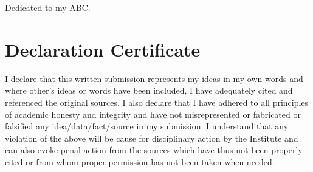 \begin{dedication}
Dedicated to my ABC.
\end{dedication}



\chapter*{Declaration Certificate}

\noindent I declare that this written submission represents my ideas in my own words and where other's ideas or words have been included, I have adequately cited and referenced the original sources. I also declare that I have adhered to all principles of academic honesty and integrity and have not misrepresented or fabricated or falsified any idea/data/fact/source in my submission. I understand that any violation of the above will be cause for disciplinary action by the Institute and can also evoke penal action from the sources which have thus not been properly cited or from whom proper permission has not been taken when needed.\\

